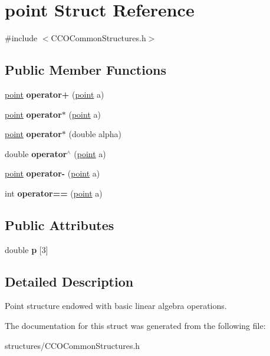 \hypertarget{structpoint}{}\section{point Struct Reference}
\label{structpoint}


{\ttfamily \#include $<$C\+C\+O\+Common\+Structures.\+h$>$}

\subsection*{Public Member Functions}
\begin{DoxyCompactItemize}
\item 
\mbox{\label{structpoint_a4c712881b83fd79c9039ccdd5cb99937}} 
\mbox{\hyperlink{structpoint}{point}} {\bfseries operator+} (\mbox{\hyperlink{structpoint}{point}} a)
\item 
\mbox{\label{structpoint_a0d3ae3b14d2b34458eec85fdf10c681f}} 
\mbox{\hyperlink{structpoint}{point}} {\bfseries operator$\ast$} (\mbox{\hyperlink{structpoint}{point}} a)
\item 
\mbox{\label{structpoint_ac02b60d2271155b71546fadb429ff062}} 
\mbox{\hyperlink{structpoint}{point}} {\bfseries operator$\ast$} (double alpha)
\item 
\mbox{\label{structpoint_acf04c4cee649781e93868bc1ea95e5ae}} 
double {\bfseries operator$^\wedge$} (\mbox{\hyperlink{structpoint}{point}} a)
\item 
\mbox{\label{structpoint_aeba7e4e06c7c0da9b68ebeef5f56b6df}} 
\mbox{\hyperlink{structpoint}{point}} {\bfseries operator-\/} (\mbox{\hyperlink{structpoint}{point}} a)
\item 
\mbox{\label{structpoint_a467f0c3a57bc85ab2851c4c7fd19ae9e}} 
int {\bfseries operator==} (\mbox{\hyperlink{structpoint}{point}} a)
\end{DoxyCompactItemize}
\subsection*{Public Attributes}
\begin{DoxyCompactItemize}
\item 
\mbox{\label{structpoint_a261ff1e6d38cdfae2183a88e4d8809e4}} 
double {\bfseries p} \mbox{[}3\mbox{]}
\end{DoxyCompactItemize}


\subsection{Detailed Description}
Point structure endowed with basic linear algebra operations. 

The documentation for this struct was generated from the following file\+:\begin{DoxyCompactItemize}
\item 
structures/C\+C\+O\+Common\+Structures.\+h\end{DoxyCompactItemize}
